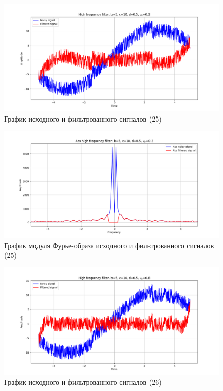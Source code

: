 \documentclass[a4paper, 12pt]{article}
\begin{document}
    \begin{figure}[!htb]
        \centering
        \includegraphics[scale=0.48]{25_u_flt_u_nolow.png}
        \captionsetup{skip=0pt}
        \caption{График исходного и фильтрованного сигналов (25)}
        \label{fig:fig_g}
    \end{figure}
    \begin{figure}[!htb]
        \centering
        \includegraphics[scale=0.48]{25_abs_u_U_nolow.png}
        \captionsetup{skip=0pt}
        \caption{График модуля Фурье-образа исходного и фильтрованного сигналов (25)}
        \label{fig:fig_h}
    \end{figure}
    \begin{figure}[!htb]
        \centering
        \includegraphics[scale=0.48]{26_u_flt_u_nolow.png}
        \captionsetup{skip=0pt}
        \caption{График исходного и фильтрованного сигналов (26)}
        \label{fig:fig_323234}
    \end{figure}
\end{document}
